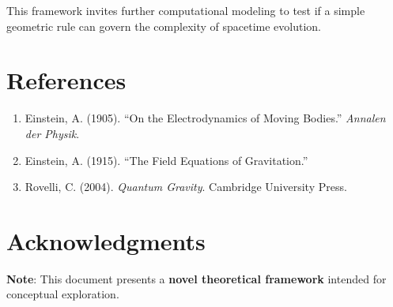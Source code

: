 \documentclass[12pt]{article}
\begin{document}
This framework invites further computational modeling to test if a simple geometric rule can govern the complexity of spacetime evolution.

\section*{References}

\begin{enumerate}
    \item Einstein, A. (1905). ``On the Electrodynamics of Moving Bodies.'' \textit{Annalen der Physik}.
    \item Einstein, A. (1915). ``The Field Equations of Gravitation.''
    \item Rovelli, C. (2004). \textit{Quantum Gravity}. Cambridge University Press.
\end{enumerate}

\section*{Acknowledgments}

\textbf{Note}: This document presents a \textbf{novel theoretical framework} intended for conceptual exploration.
\end{document}
